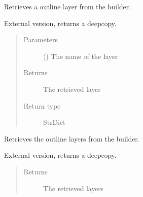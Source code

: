 \documentclass[letterpaper,10pt,english]{sphinxmanual}
\begin{document}
\begin{fulllineitems}
\begin{fulllineitems}
\begin{quote}
\begin{description}
\end{description}\end{quote}

\end{fulllineitems}


\begin{fulllineitems}
\label{\detokenize{builder:geohexviz.builder.PlotBuilder.get_outline}}
\sphinxAtStartPar
Retrieves a outline layer from the builder.

\sphinxAtStartPar
External version, returns a deepcopy.
\begin{quote}\begin{description}
\item[{Parameters}] \leavevmode
\sphinxAtStartPar
{} () \textendash{} The name of the layer

\item[{Returns}] \leavevmode
\sphinxAtStartPar
The retrieved layer

\item[{Return type}] \leavevmode
\sphinxAtStartPar
StrDict

\end{description}\end{quote}

\end{fulllineitems}


\begin{fulllineitems}
\label{\detokenize{builder:geohexviz.builder.PlotBuilder.get_outlines}}
\sphinxAtStartPar
Retrieves the outline layers from the builder.

\sphinxAtStartPar
External version, returns a deepcopy.
\begin{quote}\begin{description}
\item[{Returns}] \leavevmode
\sphinxAtStartPar
The retrieved layers


\end{description}
\end{quote}
\end{fulllineitems}
\end{fulllineitems}
\end{document}
